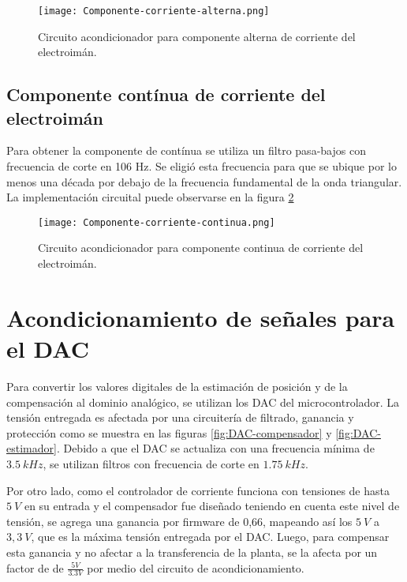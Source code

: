 \begin{figure}[H]
	\centering
	\texttt{[image: Componente-corriente-alterna.png]}
	\caption{ Circuito acondicionador para componente alterna de corriente del electroimán.
	}
	\label{fig:componente-corriente-alterna}
\end{figure}

\subsection{Componente  contínua de corriente del electroimán}

\noindent Para obtener la componente de contínua se utiliza un filtro pasa-bajos con frecuencia de corte en 106 Hz. Se eligió esta frecuencia para que se ubique por lo menos una década por debajo de la frecuencia fundamental de la onda triangular. La implementación circuital puede observarse en la figura \ref{fig:componente-corriente-continua}


\begin{figure}[H]
	\centering
	\texttt{[image: Componente-corriente-continua.png]}
	\caption{Circuito acondicionador para componente continua de corriente del electroimán.
	}
	\label{fig:componente-corriente-continua}
\end{figure}

\section{Acondicionamiento de señales para el DAC}

\noindent Para convertir los valores digitales de la estimación de posición y de la compensación al dominio analógico, se utilizan los DAC del microcontrolador. La tensión entregada es afectada por una circuitería de filtrado, ganancia y protección como se muestra en las figuras \ref{fig:DAC-compensador} y \ref{fig:DAC-estimador}. Debido a que el DAC se actualiza con una frecuencia mínima de $3.5\:kHz$, se utilizan filtros con frecuencia de corte en $1.75\:kHz$.

\noindent Por otro lado, como el controlador de corriente funciona con tensiones de hasta $5\:V$ en su entrada y el compensador fue diseñado teniendo en cuenta este nivel de tensión, se agrega una ganancia por firmware de 0,66, mapeando así los $5\:V$ a $3,3\:V$, que es la máxima tensión entregada por el DAC. Luego, para compensar esta ganancia y no afectar a la transferencia de la planta, se la afecta por un factor de de $\frac{5V}{3.3V}$ por medio del circuito de acondicionamiento.

